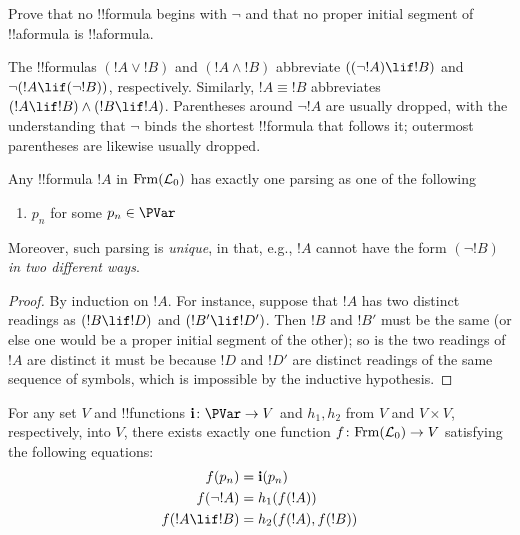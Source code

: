 \documentclass[../../include/open-logic-section]{subfiles}
\begin{document}
\begin{prob} 
Prove that no !!{formula} begins with $\lnot$ and that no proper
initial segment of !!a{formula} is !!a{formula}.
\end{prob}

\begin{explain}
The !!{formula}s $(!A \lor !B)$ and $(!A \land !B)$ abbreviate
$((\lnot !A) \lif !B)$ and $\lnot(!A \lif (\lnot !B))$,
respectively. Similarly, $!A \equiv !B$ abbreviates $(!A \lif !B)
\land (!B \lif !A)$. Parentheses around $\lnot !A$ are usually dropped,
with the understanding that $\lnot$ binds the shortest !!{formula}
that follows it; outermost parentheses are likewise usually dropped.
\end{explain}
 
\begin{prop}
Any !!{formula} $!A$ in $ \Frm[L_0]$ has
exactly one parsing as one of the following
\begin{enumerate}
\item $p_n$ for some $p_n \in  \PVar$
\end{enumerate}
Moreover, such parsing is \emph{unique}, in that, e.g., $!A$ cannot
have the form $(\lnot !B)$ \emph{ in two different ways}.
\end{prop}

\begin{proof}
By induction on $!A$. For instance, suppose that $!A$ has
two distinct readings as $(!B \lif !D)$ and $(!B' \lif
!D')$. Then $!B$ and $!B'$ must be the same (or else one would
be a proper initial segment of the other); so is the two readings of
$!A$ are distinct it must be because $!D$ and $!D'$ are
distinct readings of the same sequence of symbols, which is impossible
by the inductive hypothesis. 
\end{proof}

\begin{thm} 
For any set $V$ and !!{function}s $\mathbf{i} \colon \PVar \to V$ and
$h_1, h_2$ from $V$ and $V \times V$, respectively, into $V$, there
exists exactly one function $f \colon \Frm[L_0] \to V$ satisfying the
following equations:
\begin{align*}
  f(p_n) &= \mathbf{i}(p_n) \\
  f(\lnot !A) &= h_1(f(!A))\\
  f(!A \lif !B) &= h_2(f(!A),f(!B))
\end{align*}
\end{thm}
\end{document}
